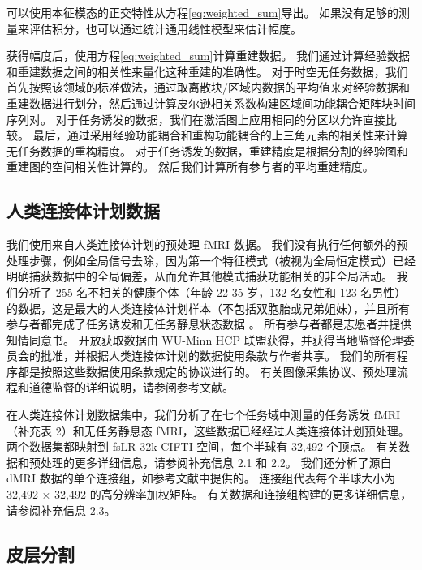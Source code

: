 \documentclass[lang=cn,a4paper,newtx]{elegantpaper}
\begin{document}
可以使用本征模态的正交特性从方程\ref{eq:weighted_sum}导出\cite{robinson2021determination,courant2008methods}。
如果没有足够的测量来评估积分，也可以通过统计通用线性模型来估计幅度。


获得幅度后，使用方程\ref{eq:weighted_sum}计算重建数据。
我们通过计算经验数据和重建数据之间的相关性来量化这种重建的准确性。
对于时空无任务数据，我们首先按照该领域的标准做法，通过取离散块/区域内数据的平均值来对经验数据和重建数据进行划分\cite{eickhoff2018imaging}，然后通过计算皮尔逊相关系数构建区域间功能耦合矩阵块时间序列对。
对于任务诱发的数据，我们在激活图上应用相同的分区以允许直接比较。
最后，通过采用经验功能耦合和重构功能耦合的上三角元素的相关性来计算无任务数据的重构精度。
对于任务诱发的数据，重建精度是根据分割的经验图和重建图的空间相关性计算的。
然后我们计算所有参与者的平均重建精度。



\subsection{人类连接体计划数据} \label{sec:HCP_data}

我们使用来自人类连接体计划\cite{van2013wu}的预处理 fMRI 数据。
我们没有执行任何额外的预处理步骤，例如全局信号去除，因为第一个特征模式（被视为全局恒定模式）已经明确捕获数据中的全局偏差，从而允许其他模式捕获功能相关的非全局活动。
我们分析了 255 名不相关的健康个体（年龄 22-35 岁，132 名女性和 123 名男性）的数据，这是最大的人类连接体计划样本（不包括双胞胎或兄弟姐妹），并且所有参与者都完成了任务诱发和无任务静息状态数据 。
所有参与者都是志愿者并提供知情同意书。 开放获取数据由 WU-Minn HCP 联盟获得，并获得当地监督伦理委员会的批准，并根据人类连接体计划的数据使用条款与作者共享。
我们的所有程序都是按照这些数据使用条款规定的协议进行的。 有关图像采集协议、预处理流程和道德监督的详细说明，请参阅参考文献\cite{van2013wu,barch2013function}。


在人类连接体计划数据集中，我们分析了在七个任务域中测量的任务诱发 fMRI（补充表 2）和无任务静息态 fMRI，这些数据已经经过人类连接体计划预处理。
两个数据集都映射到 fsLR-32k CIFTI 空间，每个半球有 32,492 个顶点。
有关数据和预处理的更多详细信息，请参阅补充信息 2.1 和 2.2。
我们还分析了源自 dMRI 数据的单个连接组，如参考文献中提供的\cite{tian2021high}。
连接组代表每个半球大小为 32,492 × 32,492 的高分辨率加权矩阵。
有关数据和连接组构建的更多详细信息，请参阅补充信息 2.3。


\subsection{皮层分割} \label{sec:cortical_parcellations}
\end{document}
